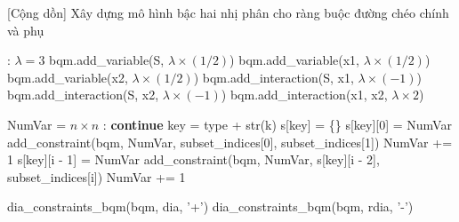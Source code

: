 \begin{algorithm}[H]
	\caption{[Cộng dồn] Xây dựng mô hình bậc hai nhị phân cho ràng buộc đường chéo chính và phụ}
	\begin{algorithmic}[1]
		
		:
		\State  $\lambda = 3$
		\State  bqm.add\_variable(S, $\lambda \times (1 / 2)$)
		\State  bqm.add\_variable(x1, $\lambda \times (1 / 2)$)
		\State  bqm.add\_variable(x2, $\lambda \times (1 / 2)$)
		\State  bqm.add\_interaction(S, x1, $\lambda \times (-1)$)
		\State  bqm.add\_interaction(S, x2, $\lambda \times (-1)$)
		\State  bqm.add\_interaction(x1, x2, $\lambda \times 2$)
		\EndFunction
		
		\State
		\State NumVar = $n \times n$
		:
		\State    \textbf{continue}
		\EndIf
		\State   key = type + str(k)
		\State    s[key] = \{\}
		\EndIf
		\State   s[key][0] = NumVar
		\State   add\_constraint(bqm, NumVar, subset\_indices[0], subset\_indices[1])
		\State   NumVar += 1
		\State    s[key][i - 1] = NumVar
		\State    add\_constraint(bqm, NumVar, s[key][i - 2], subset\_indices[i])
		\State    NumVar += 1
		\EndFor
		\EndFor
		\EndFunction
		
		\State
		\State dia\_constraints\_bqm(bqm, dia, '+')
		\State dia\_constraints\_bqm(bqm, rdia, '-')
        
	\end{algorithmic}
\end{algorithm}

